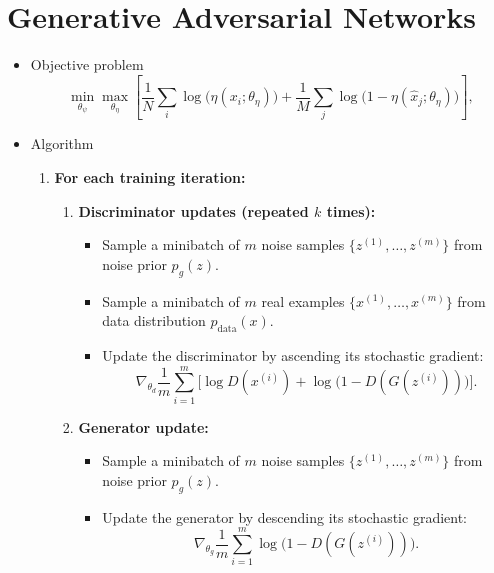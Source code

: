 \documentclass[11pt]{article}
\begin{document}
\section{Generative Adversarial Networks}
\begin{itemize}
	\item Objective problem
	      \[
		      \min_{\theta_\psi} \max_{\theta_\eta}
		      \left[
			      \frac{1}{N} \sum_i \log \big( \eta(x_i; \theta_\eta) \big)
			      +
			      \frac{1}{M} \sum_j \log \big( 1 - \eta(\hat{x}_j; \theta_\eta) \big)
			      \right],
	      \]
	\item Algorithm

	      \begin{enumerate}
		      \item \textbf{For each training iteration:}
		            \begin{enumerate}
			            \item \textbf{Discriminator updates (repeated $k$ times):}
			                  \begin{itemize}
				                  \item Sample a minibatch of $m$ noise samples $\{ z^{(1)}, \ldots, z^{(m)} \}$ from noise prior $p_g(z)$.
				                  \item Sample a minibatch of $m$ real examples $\{ x^{(1)}, \ldots, x^{(m)} \}$ from data distribution $p_{\text{data}}(x)$.
				                  \item Update the discriminator by ascending its stochastic gradient:
				                        \[
					                        \nabla_{\theta_d} \frac{1}{m} \sum_{i=1}^{m}
					                        \Big[
						                        \log D(x^{(i)}) + \log \big(1 - D(G(z^{(i)}))\big)
						                        \Big].
				                        \]
			                  \end{itemize}

			            \item \textbf{Generator update:}
			                  \begin{itemize}
				                  \item Sample a minibatch of $m$ noise samples $\{ z^{(1)}, \ldots, z^{(m)} \}$ from noise prior $p_g(z)$.
				                  \item Update the generator by descending its stochastic gradient:
				                        \[
					                        \nabla_{\theta_g} \frac{1}{m} \sum_{i=1}^{m}
					                        \log \big(1 - D(G(z^{(i)}))\big).
				                        \]
			                  \end{itemize}
		            \end{enumerate}
	      \end{enumerate}
\end{itemize}
\end{document}
